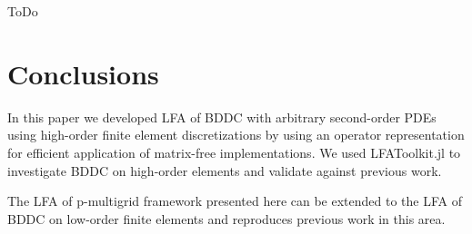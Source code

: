 \documentclass[review]{siamart190516}
\begin{document}
ToDo

\section{Conclusions}\label{sec:conclusion}

In this paper we developed LFA of BDDC with arbitrary second-order PDEs using high-order finite element discretizations by using an operator representation for efficient application of matrix-free implementations.
We used LFAToolkit.jl to investigate BDDC on high-order elements and validate against previous work.

The LFA of p-multigrid framework presented here can be extended to the LFA of BDDC on low-order finite elements and reproduces previous work in this area.



\end{document}
